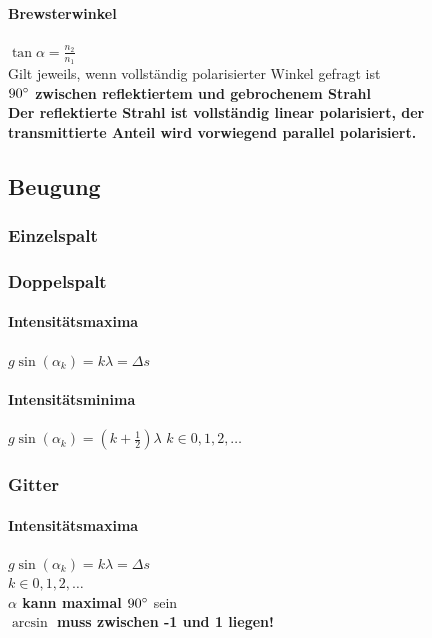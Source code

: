 \documentclass[12pt, a4paper]{scrreprt}
\begin{document}
\paragraph{Brewsterwinkel} \dotfill \(\tan \alpha = \frac{n_2}{n_1}\)\\
\myhspace{} Gilt jeweils, wenn vollständig polarisierter Winkel gefragt ist\\
\myhspace{} \textbf{\(90 \degree\) zwischen reflektiertem und gebrochenem Strahl}\\
\myhspace{} \textbf{Der reflektierte Strahl ist vollständig linear polarisiert, der transmittierte Anteil wird vorwiegend parallel polarisiert.}

\subsection{Beugung}

\subsubsection{Einzelspalt}

\subsubsection{Doppelspalt}

\paragraph{Intensitätsmaxima} \dotfill \(g \sin(\alpha _k) = k \lambda = \Delta s\)
\paragraph{Intensitätsminima} \dotfill \(g \sin(\alpha _k) = \left( k + \frac{1}{2} \right) \lambda\)
\myhspace{} \textbf{\(k \in 0, 1, 2, \dots\)}

\subsubsection{Gitter}

\paragraph{Intensitätsmaxima} \dotfill \(g \sin(\alpha _k) = k \lambda = \Delta s\)\\
\myhspace{} \textbf{\(k \in 0, 1, 2, \dots\)}\\
\myhspace{} \textbf{\(\alpha\) kann maximal \(90\degree\)} sein\\
\myhspace{} \textbf{\(\arcsin\) muss zwischen -1 und 1 liegen!}
\end{document}

